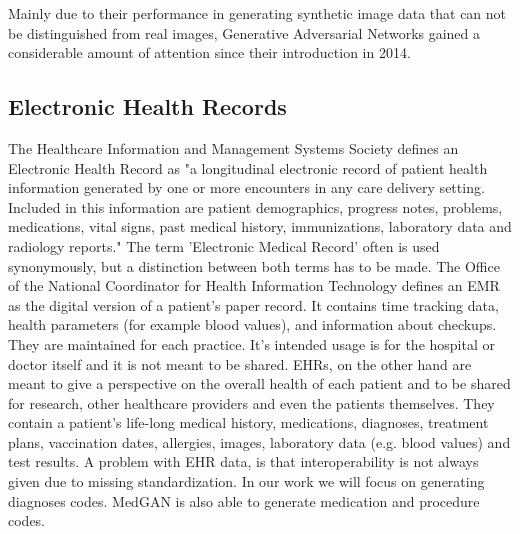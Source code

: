 \documentclass[11pt, a4paper]{book}
\begin{document}
Mainly due to their performance in generating synthetic image data that can not be distinguished from real images, Generative Adversarial Networks gained a considerable amount of attention since their introduction in 2014.


\subsection{Electronic Health Records}
The Healthcare Information and Management Systems Society defines an Electronic Health Record as "a longitudinal electronic record of patient health information generated by one or more encounters in any care delivery setting. Included in this information are patient demographics, progress notes, problems, medications, vital signs, past medical history, immunizations, laboratory data and radiology reports." \cite{HIMMS}
The term 'Electronic Medical Record' often is used synonymously, but a distinction between both terms has to be made.
The Office of the National Coordinator for Health Information Technology defines an EMR as the digital version of a patient's paper record. It contains time tracking data, health parameters (for example blood values), and information about checkups. They are maintained for each practice. It's intended usage is for the hospital or doctor itself and it is not meant to be shared. \cite{ONC}
EHRs, on the other hand are meant to give a perspective on the overall health of each patient and to be shared for research, other healthcare providers and even the patients themselves. They contain a patient’s life-long medical history, medications, diagnoses, treatment plans, vaccination dates, allergies, images, laboratory data (e.g. blood values) and test results. \cite{ONC} A problem with EHR data, is that interoperability is not always given due to missing standardization. \cite{johnson2016mimic}
In our work we will focus on generating diagnoses codes. MedGAN is also able to generate medication and procedure codes.
\end{document}
